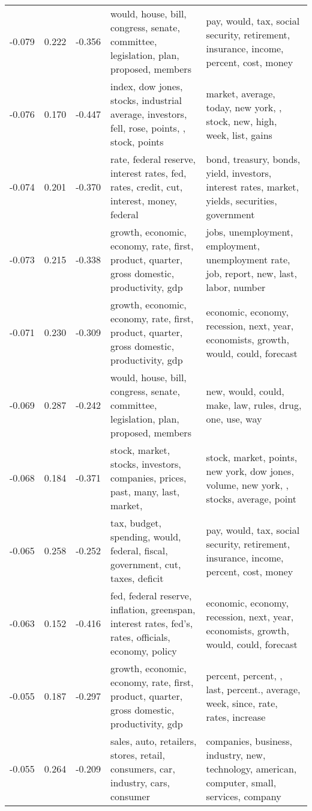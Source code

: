 \begin{tabular}{cccp{5cm}p{5cm}}
-0.079 & 0.222 & -0.356 & would, house, bill, congress, senate, committee, legislation, plan, proposed, members & pay, would, tax, social security, retirement, insurance, income, percent, cost, money \\
-0.076 & 0.170 & -0.447 & index, dow jones, stocks, industrial average, investors, fell, rose, points, , stock, points & market, average, today, new york, , stock, new, high, week, list, gains \\
-0.074 & 0.201 & -0.370 & rate, federal reserve, interest rates, fed, rates, credit, cut, interest, money, federal & bond, treasury, bonds, yield, investors, interest rates, market, yields, securities, government \\
-0.073 & 0.215 & -0.338 & growth, economic, economy, rate, first, product, quarter, gross domestic, productivity, gdp & jobs, unemployment, employment, unemployment rate, job, report, new, last, labor, number \\
-0.071 & 0.230 & -0.309 & growth, economic, economy, rate, first, product, quarter, gross domestic, productivity, gdp & economic, economy, recession, next, year, economists, growth, would, could, forecast \\
-0.069 & 0.287 & -0.242 & would, house, bill, congress, senate, committee, legislation, plan, proposed, members & new, would, could, make, law, rules, drug, one, use, way \\
-0.068 & 0.184 & -0.371 & stock, market, stocks, investors, companies, prices, past, many, last, market,  & stock, market, points, new york, dow jones, volume, new york, , stocks, average, point \\
-0.065 & 0.258 & -0.252 & tax, budget, spending, would, federal, fiscal, government, cut, taxes, deficit & pay, would, tax, social security, retirement, insurance, income, percent, cost, money \\
-0.063 & 0.152 & -0.416 & fed, federal reserve, inflation, greenspan, interest rates, fed's, rates, officials, economy, policy & economic, economy, recession, next, year, economists, growth, would, could, forecast \\
-0.055 & 0.187 & -0.297 & growth, economic, economy, rate, first, product, quarter, gross domestic, productivity, gdp & percent, percent, , last, percent., average, week, since, rate, rates, increase \\
-0.055 & 0.264 & -0.209 & sales, auto, retailers, stores, retail, consumers, car, industry, cars, consumer & companies, business, industry, new, technology, american, computer, small, services, company \\

\end{tabular}
